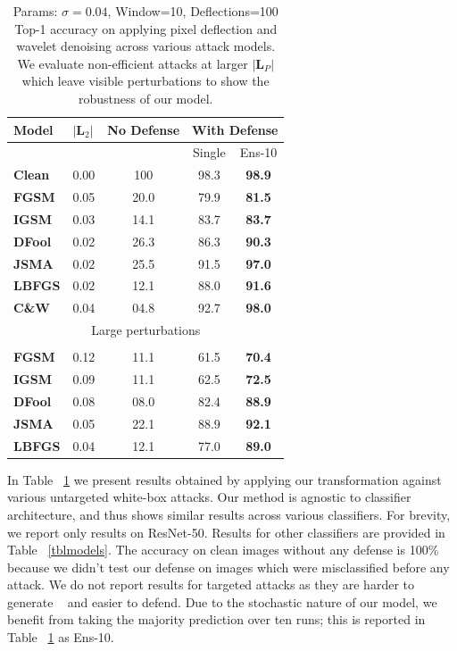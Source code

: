 \begin{table}[H]
\small
\centering
{}
\begin{tabular}{lcccc}
\textbf{Model} & \multicolumn{1}{l}{$|\boldsymbol{L}_2|$} & \multicolumn{1}{l}{\textbf{No Defense}} & \multicolumn{2}{l}{\textbf{With Defense}} \\ \hline
 & \multicolumn{1}{l}{} & \multicolumn{1}{l}{} & Single & Ens-10 \\ \cline{4-5} 
 \textbf{Clean} & 0.00 & 100 & 98.3 & \textbf{98.9} \\ \hline
\textbf{FGSM} & 0.05 & 20.0 & 79.9 & \textbf{81.5} \\
\textbf{IGSM} & 0.03 & 14.1 & 83.7 & \textbf{83.7} \\
\textbf{DFool} & 0.02 & 26.3 & 86.3 & \textbf{90.3} \\
\textbf{JSMA} & 0.02 & 25.5 & 91.5 & \textbf{97.0} \\
\textbf{LBFGS} & 0.02 & 12.1 & 88.0 & \textbf{91.6} \\
\textbf{C\&W} & 0.04 & 04.8 & 92.7 & \textbf{98.0}
\\
 \multicolumn{5}{c}{Large perturbations} \\ \hline
 &&&&\\
\textbf{FGSM} & 0.12 & 11.1 & 61.5 &  \textbf{70.4}\\
\textbf{IGSM} & 0.09 & 11.1 & 62.5 &  \textbf{72.5}\\
\textbf{DFool} & 0.08 & 08.0 & 82.4 &  \textbf{88.9}\\
\textbf{JSMA} & 0.05 & 22.1 & 88.9 &  \textbf{92.1}\\
\textbf{LBFGS} & 0.04 & 12.1 & 77.0 & \textbf{89.0} \\
\end{tabular}
\caption[Classification Accuracy with Pixel Deflection]{ Params: $\sigma=0.04$, Window=10, Deflections=100 \\Top-1 accuracy on applying pixel deflection and wavelet denoising across various attack models. We evaluate non-efficient attacks at larger $|\bm{L}_P|$ which leave visible perturbations to show the robustness of our model.
 \label{tblresults}}
\end{table}
In Table ~\ref{tblresults} we present results obtained by applying our transformation against various untargeted white-box attacks. 
Our method is agnostic to classifier architecture, and thus shows similar results across various classifiers. 
For brevity, we report only results on ResNet-50. 
Results for other classifiers are provided in Table ~\ref{tblmodels}.
The accuracy on clean images without any defense is 100\% because we didn't test our defense on images which were misclassified before any attack.
We do not report results for targeted attacks as they are harder to generate ~\cite{Carlini2017TowardsET} and easier to defend. 
Due to the stochastic nature of our model, we benefit from taking the majority prediction over ten runs; this is reported in Table ~\ref{tblresults} as Ens-10.

